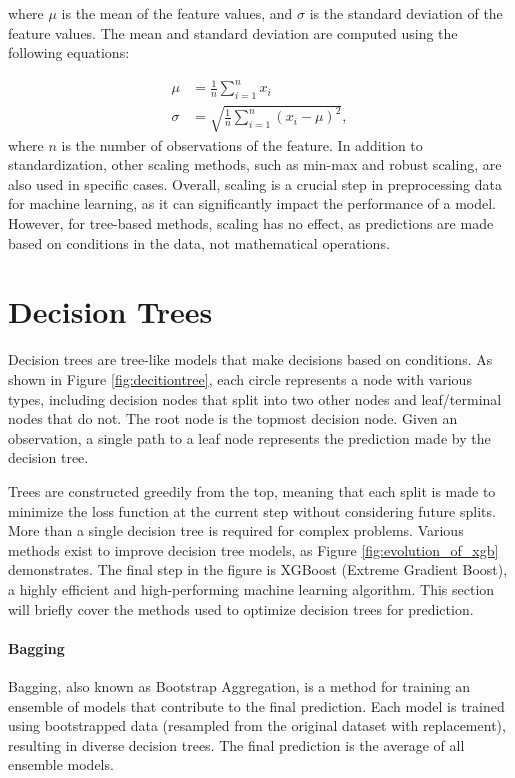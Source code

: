 where $\mu$ is the mean of the feature values, and $\sigma$ is the standard deviation of the feature values.
The mean and standard deviation are computed using the following equations:

\begin{align}
\mu &= \frac{1}{n}\sum_{i=1}^{n}x_i\\
\sigma &= \sqrt{\frac{1}{n}\sum_{i=1}^{n}(x_i - \mu)^2},
\end{align}
where $n$ is the number of observations of the feature.
In addition to standardization, other scaling methods, such as min-max and robust scaling, are also used in specific cases.
Overall, scaling is a crucial step in preprocessing data for machine learning, as it can significantly impact the performance of a model.
However, for tree-based methods, scaling has no effect, as predictions are made based on conditions in the data, not mathematical operations.


\section{Decision Trees}
Decision trees are tree-like models that make decisions based on conditions.
As shown in Figure \ref{fig:decitiontree}, each circle represents a node with various types, including decision nodes that split into two other nodes and leaf/terminal nodes that do not.
The root node is the topmost decision node.
Given an observation, a single path to a leaf node represents the prediction made by the decision tree.

Trees are constructed greedily from the top, meaning that each split is made to minimize the loss function at the current step without considering future splits.
More than a single decision tree is required for complex problems.
Various methods exist to improve decision tree models, as Figure \ref{fig:evolution_of_xgb} demonstrates.
The final step in the figure is XGBoost (Extreme Gradient Boost), a highly efficient and high-performing machine learning algorithm.
This section will briefly cover the methods used to optimize decision trees for prediction.
\cite{Mehta_2019}


\paragraph{Bagging}
Bagging, also known as Bootstrap Aggregation, is a method for training an ensemble of models that contribute to the final prediction.
Each model is trained using bootstrapped data (resampled from the original dataset with replacement), resulting in diverse decision trees.
The final prediction is the average of all ensemble models.

